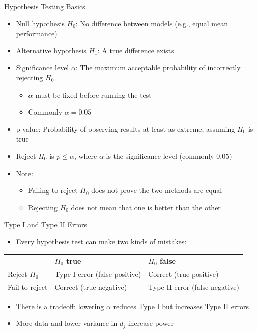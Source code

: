 \documentclass[main]{subfiles}
\begin{document}
\begin{frame}[c]{Hypothesis Testing Basics}
    \begin{itemize}
        \item Null hypothesis $H_0$: No difference between models (e.g., equal mean performance)
        \item Alternative hypothesis $H_1$: A true difference exists
        \item Significance level $\alpha$: The maximum acceptable probability of incorrectly rejecting $H_0$
        \begin{itemize}
            \item $\alpha$ must be fixed \alert{before} running the test
            \item Commonly $\alpha=0.05$
        \end{itemize}
        \item p-value: Probability of observing results at least as extreme, assuming $H_0$ is true
    \end{itemize}
    \begin{itemize}
        \item Reject $H_0$ is $p \leq \alpha$, where $\alpha$ is the significance level (commonly $0.05$)
        \item \alert{Note}:
    \begin{itemize}
        \item Failing to reject $H_0$ does not prove the two methods are equal
        \item Rejecting $H_0$ does not mean that one is better than the other
    \end{itemize}
    \end{itemize}
\end{frame}

\begin{frame}{Type I and Type II Errors}
    \begin{itemize}
        \item Every hypothesis test can make two kinds of mistakes:
    \end{itemize}
    \begin{center}
        \begin{tabular}{lll}
            \toprule
             & $H_0$ true & $H_0$ false \\
             \midrule
             Reject $H_0$ & \alert{Type I error} (false positive) & Correct (true positive) \\
             Fail to reject & Correct (true negative) & \alert{Type II error} (false negative)\\
             \bottomrule
        \end{tabular}
    \end{center}
    \begin{itemize}
        \item There is a tradeoff: lowering $\alpha$ reduces Type I but increases Type II errors
        \item More data and lower variance in $d_j$ increase power
    \end{itemize}
\end{frame}
\end{document}
